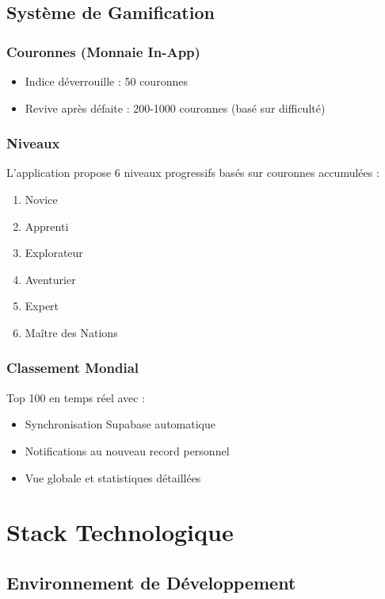 \documentclass[12pt,a4paper,openany]{report}
\begin{document}
    \section{Système de Gamification}

    \subsection{Couronnes (Monnaie In-App)}
    \begin{itemize}
      \item Indice déverrouille : 50 couronnes
      \item Revive après défaite : 200-1000 couronnes (basé sur difficulté)
    \end{itemize}

    \subsection{Niveaux}
    L'application propose 6 niveaux progressifs basés sur couronnes accumulées :
    \begin{enumerate}
      \item Novice
      \item Apprenti
      \item Explorateur
      \item Aventurier
      \item Expert
      \item Maître des Nations
    \end{enumerate}

    \subsection{Classement Mondial}
    Top 100 en temps réel avec :
    \begin{itemize}
      \item Synchronisation Supabase automatique
      \item Notifications au nouveau record personnel
      \item Vue globale et statistiques détaillées
    \end{itemize}

    \chapter{Stack Technologique}

    \section{Environnement de Développement}
\end{document}
